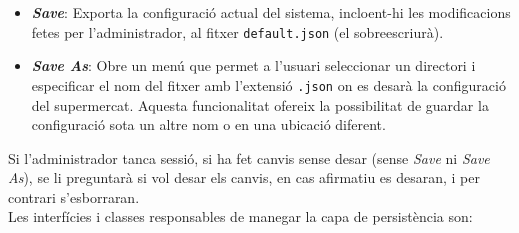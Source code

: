 \documentclass[a4paper,12pt]{report}
\begin{document}
\begin{itemize}
	\item \textbf{\textit{Save}}: Exporta la configuració actual del sistema, incloent-hi les modificacions fetes per l'administrador, al fitxer \texttt{default.json} (el sobreescriurà).
	
	\item \textbf{\textit{Save As}}: Obre un menú que permet a l'usuari seleccionar un directori i especificar el nom del fitxer amb l'extensió \texttt{.json} on es desarà la configuració del supermercat. Aquesta funcionalitat ofereix la possibilitat de guardar la configuració sota un altre nom o en una ubicació diferent.
\end{itemize}

Si l'administrador tanca sessió, si ha fet canvis sense desar (sense \textit{Save} ni \textit{Save As}), se li preguntarà si vol desar els canvis, en cas afirmatiu es desaran, i per contrari s'esborraran. \\

Les interfícies i classes responsables de manegar la capa de persistència son:
\end{document}
